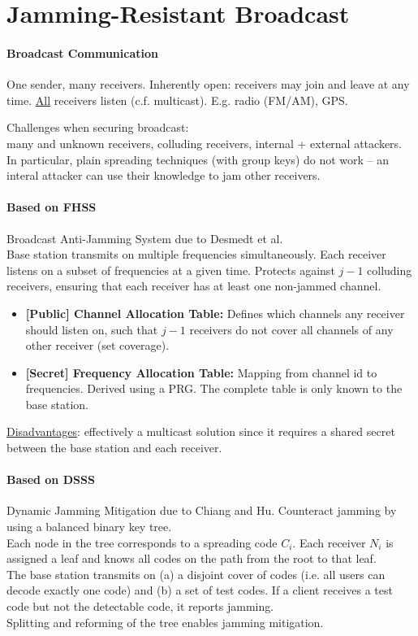 \section{Jamming-Resistant Broadcast}

\paragraph{Broadcast Communication}
One sender, many receivers.
Inherently open: receivers may join and leave at any time.
\underline{All} receivers listen (c.f. multicast).
E.g. radio (FM/AM), GPS.

Challenges when securing broadcast:  \\
many and unknown receivers, colluding receivers, internal + external attackers.
In particular, plain spreading techniques (with group keys) do not work -- an interal attacker can use their knowledge to jam other receivers.

\paragraph{Based on FHSS}
Broadcast Anti-Jamming System due to Desmedt et al. \\
Base station transmits on multiple frequencies simultaneously.
Each receiver listens on a subset of frequencies at a given time.
Protects against $j-1$ colluding receivers, ensuring that each receiver has at least one non-jammed channel.

\begin{itemize}
	\item \textbf{[Public] Channel Allocation Table:}
	Defines which channels any receiver should listen on, such that $j-1$ receivers do not cover all channels of any other receiver (set coverage).
	\item \textbf{[Secret] Frequency Allocation Table:}
	Mapping from channel id to frequencies.
	Derived using a PRG.
	The complete table is only known to the base station.
\end{itemize}
%
\underline{Disadvantages}:
effectively a multicast solution since it requires a shared secret between the base station and each receiver.

\paragraph{Based on DSSS}
Dynamic Jamming Mitigation due to Chiang and Hu.
Counteract jamming by using a balanced binary key tree.
\\
Each node in the tree corresponds to a spreading code $C_i$.
Each receiver $N_i$ is assigned a leaf and knows all codes on the path from the root to that leaf.
\\
The base station transmits on (a) a disjoint cover of codes (i.e. all users can decode exactly one code) and (b) a set of test codes.
If a client receives a test code but not the detectable code, it reports jamming.
\\
Splitting and reforming of the tree enables jamming mitigation.

